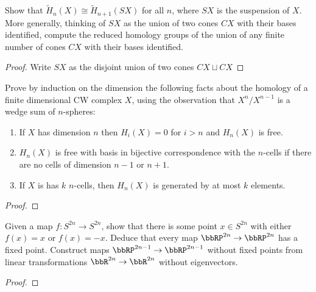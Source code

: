 \begin{problem}[Hatcher {\S}2.1, Ex.\@ 20]
Show that $\widetilde H_n(X)\cong\widetilde H_{n+1}(SX)$ for all $n$, where
$SX$ is the suspension of $X$. More generally, thinking of $SX$ as the
union of two cones $CX$ with their bases identified, compute the reduced
homology groups of the union of any finite number of cones $CX$ with their
bases identified.
\end{problem}
\begin{proof}
Write $SX$ as the disjoint union of two cones $CX\sqcup CX$
\end{proof}
\newpage

\begin{problem}[Hatcher {\S}2.1, Ex.\@ 22]
Prove by induction on the dimension the following facts about the homology
of a finite dimensional CW complex $X$, using the observation that
$X^n/X^{n-1}$ is a wedge sum of $n$-spheres:
\begin{enumerate}[label=(\alph*)]
\item If $X$ has dimension $n$ then $H_i(X)=0$ for $i>n$ and $H_n(X)$ is
  free.
\item $H_n(X)$ is free with basis in bijective correspondence with the
  $n$-cells if there are no cells of dimension $n-1$ or $n+1$.
\item If $X$ is has $k$ $n$-cells, then $H_n(X)$ is generated by at most
  $k$ elements.
\end{enumerate}
\end{problem}
\begin{proof}
\end{proof}
\newpage

\begin{problem}[Hatcher {\S}2.2, Ex.\@ 2]
Given a map $f\colon S^{2n}\to S^{2n}$, show that there is some point $x\in
S^{2n}$ with either $f(x)=x$ or $f(x)=-x$. Deduce that every map
$\bbRP^{2n}\to\bbRP^{2n}$ has a fixed point. Construct maps
$\bbRP^{2n-1}\to\bbRP^{2n-1}$ without fixed points from linear
transformations $\bbR^{2n}\to\bbR^{2n}$ without eigenvectors.
\end{problem}
\begin{proof}
\end{proof}

